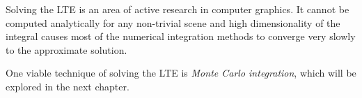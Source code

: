 Solving the LTE is an area of active research in computer graphics. It cannot be computed analytically for any non-trivial scene and high dimensionality of the integral causes most of the numerical integration methods to converge very slowly to the approximate solution.

One viable technique of solving the LTE is \emph{Monte Carlo integration}, which will be explored in the next chapter.
